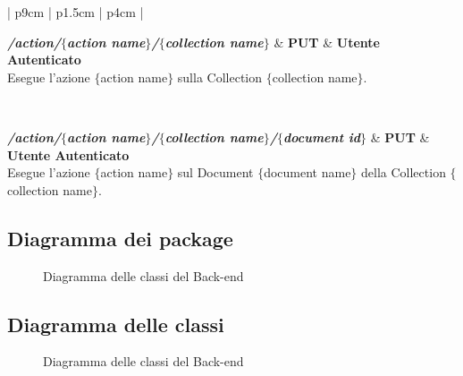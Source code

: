 \begin{center}
\begin{longtable}{| p{9cm} | p{1.5cm} | p{4cm} |}
	 {} \\ \hline
	
	\textbf{\emph{/action/$\{$action name$\}$/$\{$collection name$\}$}} & \textbf{PUT} & \textbf{Utente Autenticato} \\ \hline
	 {Esegue l'azione $\{$action name$\}$ sulla Collection $\{$collection name$\}$.}  \\ 
	\specialrule{1pt}{1pt}{1pt}
	
	 {} \\ \hline
	
	\textbf{\emph{/action/$\{$action name$\}$/$\{$collection name$\}$/$\{$document id$\}$}} & \textbf{PUT} & \textbf{Utente Autenticato} \\ \hline
	 {Esegue l'azione $\{$action name$\}$ sul Document $\{$document name$\}$ della Collection 
	$\{$collection name$\}$.}  \\ 
	\specialrule{1pt}{1pt}{1pt}

	
\end{longtable}
	  \egroup
\end{center}
\subsection{Diagramma dei package}

\begin{figure}[H]
\centering
\caption{Diagramma delle classi del Back-end}
\label{diagrammaClassiBackEnd}
\end{figure}

\subsection{Diagramma delle classi}

\begin{figure}[H]
\centering
\caption{Diagramma delle classi del Back-end}
\label{diagrammaClassiBackEnd}
\end{figure}




